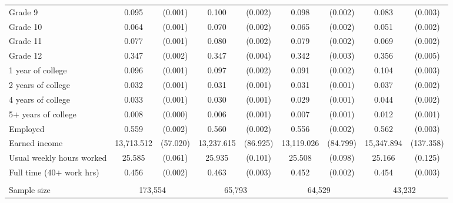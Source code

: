 \begin{tabular}{lcccccccc}
 \hspace{0.3cm} Grade 9   & 0.095 & (0.001)  & 0.100 & (0.002)  & 0.098 & (0.002)  & 0.083 & (0.003)  \\
 \hspace{0.3cm} Grade 10   & 0.064 & (0.001)  & 0.070 & (0.002)  & 0.065 & (0.002)  & 0.051 & (0.002)  \\
 \hspace{0.3cm} Grade 11   & 0.077 & (0.001)  & 0.080 & (0.002)  & 0.079 & (0.002)  & 0.069 & (0.002)  \\
 \hspace{0.3cm} Grade 12   & 0.347 & (0.002)  & 0.347 & (0.004)  & 0.342 & (0.003)  & 0.356 & (0.005)  \\
 \hspace{0.3cm} 1 year of college   & 0.096 & (0.001)  & 0.097 & (0.002)  & 0.091 & (0.002)  & 0.104 & (0.003)  \\
 \hspace{0.3cm} 2 years of college   & 0.032 & (0.001)  & 0.031 & (0.001)  & 0.031 & (0.001)  & 0.037 & (0.002)  \\
 \hspace{0.3cm} 4 years of college   & 0.033 & (0.001)  & 0.030 & (0.001)  & 0.029 & (0.001)  & 0.044 & (0.002)  \\
 \hspace{0.3cm} 5$+$ years of college   & 0.008 & (0.000)  & 0.006 & (0.001)  & 0.007 & (0.001)  & 0.012 & (0.001)  \\
 Employed   & 0.559 & (0.002)  & 0.560 & (0.002)  & 0.556 & (0.002)  & 0.562 & (0.003)  \\
 Earned income   & 13,713.512 & (57.020)  & 13,237.615 & (86.925)  & 13,119.026 & (84.799)  & 15,347.894 & (137.358)  \\
 Usual weekly hours worked   & 25.585 & (0.061)  & 25.935 & (0.101)  & 25.508 & (0.098)  & 25.166 & (0.125)  \\
 Full time (40$+$ work hrs)   & 0.456 & (0.002)  & 0.463 & (0.003)  & 0.452 & (0.002)  & 0.454 & (0.003)  \\
\\
Sample size & \multicolumn{2}{c}{173,554}  & \multicolumn{2}{c}{65,793}  & \multicolumn{2}{c}{64,529}  & \multicolumn{2}{c}{43,232}  \\
\bottomrule
\bottomrule
\end{tabular}